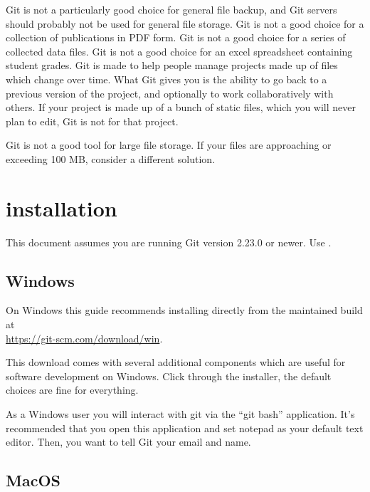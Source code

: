 \documentclass{training}
\begin{document}
Git is not a particularly good choice for general file backup, and Git servers should probably not be used for general file storage.
Git is not a good choice for a collection of publications in PDF form.
Git is not a good choice for a series of collected data files.
Git is not a good choice for an excel spreadsheet containing student grades.
Git is made to help people manage projects made up of files which change over time.
What Git gives you is the ability to go back to a previous version of the project, and optionally to work collaboratively with others.
If your project is made up of a bunch of static files, which you will never plan to edit, Git is not for that project.

Git is not a good tool for large file storage.
If your files are approaching or exceeding 100 MB, consider a different solution.

\clearpage
\section{installation}

This document assumes you are running Git version 2.23.0 or newer. Use .

\subsection*{Windows}

On Windows this guide recommends installing directly from the maintained build at \\ \url{https://git-scm.com/download/win}.

This download comes with several additional components which are useful for software development on Windows.
Click through the installer, the default choices are fine for everything.

As a Windows user you will interact with git via the ``git bash'' application.
It's recommended that you open this application and set notepad as your default text editor.
Then, you want to tell Git your email and name.


\subsection*{MacOS}
\end{document}
